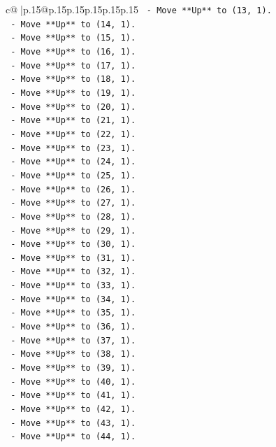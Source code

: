 \documentclass{article}
\begin{document}
{\begin{supertabular}{c@{$\;$}|p{.15\linewidth}@{}p{.15\linewidth}p{.15\linewidth}p{.15\linewidth}p{.15\linewidth}p{.15\linewidth}}
{{{\texttt{  {-} Move **Up** to (13, 1).} \\
\texttt{  {-} Move **Up** to (14, 1).} \\
\texttt{  {-} Move **Up** to (15, 1).} \\
\texttt{  {-} Move **Up** to (16, 1).} \\
\texttt{  {-} Move **Up** to (17, 1).} \\
\texttt{  {-} Move **Up** to (18, 1).} \\
\texttt{  {-} Move **Up** to (19, 1).} \\
\texttt{  {-} Move **Up** to (20, 1).} \\
\texttt{  {-} Move **Up** to (21, 1).} \\
\texttt{  {-} Move **Up** to (22, 1).} \\
\texttt{  {-} Move **Up** to (23, 1).} \\
\texttt{  {-} Move **Up** to (24, 1).} \\
\texttt{  {-} Move **Up** to (25, 1).} \\
\texttt{  {-} Move **Up** to (26, 1).} \\
\texttt{  {-} Move **Up** to (27, 1).} \\
\texttt{  {-} Move **Up** to (28, 1).} \\
\texttt{  {-} Move **Up** to (29, 1).} \\
\texttt{  {-} Move **Up** to (30, 1).} \\
\texttt{  {-} Move **Up** to (31, 1).} \\
\texttt{  {-} Move **Up** to (32, 1).} \\
\texttt{  {-} Move **Up** to (33, 1).} \\
\texttt{  {-} Move **Up** to (34, 1).} \\
\texttt{  {-} Move **Up** to (35, 1).} \\
\texttt{  {-} Move **Up** to (36, 1).} \\
\texttt{  {-} Move **Up** to (37, 1).} \\
\texttt{  {-} Move **Up** to (38, 1).} \\
\texttt{  {-} Move **Up** to (39, 1).} \\
\texttt{  {-} Move **Up** to (40, 1).} \\
\texttt{  {-} Move **Up** to (41, 1).} \\
\texttt{  {-} Move **Up** to (42, 1).} \\
\texttt{  {-} Move **Up** to (43, 1).} \\
\texttt{  {-} Move **Up** to (44, 1).} \\
}}}
\end{supertabular}}
\end{document}
